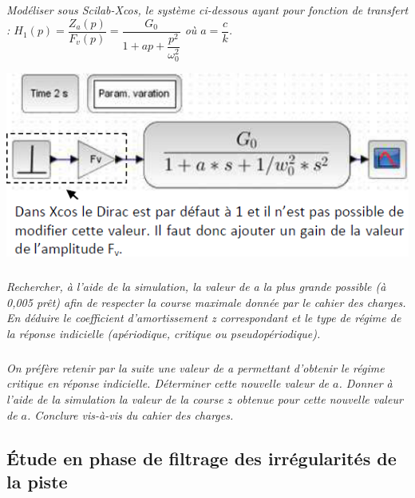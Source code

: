 \documentclass[10pt,fleqn]{article} %
\begin{document}
\begin{multicols}{2}
\subparagraph{}
\textit{Modéliser sous Scilab-Xcos, le système ci-dessous ayant pour fonction de transfert :
$H_1(p)=\dfrac{Z_a(p)}{F_v(p)}=\dfrac{G_0}{1+ap+\dfrac{p^2}{\omega_0^2}}$ où $a =\dfrac{c}{k}$.}


\begin{center}
\includegraphics[width=\linewidth]{images/img_04}
\end{center}




\subparagraph{}
\textit{Rechercher, à l’aide de la simulation, la valeur de a la plus grande possible (à 0,005 prêt) afin de respecter
la course maximale donnée par le cahier des charges. En déduire le coefficient d’amortissement z
correspondant et le type de régime de la réponse indicielle (apériodique, critique ou pseudopériodique).}
\ifprof
\begin{corrige}
\end{corrige}
\else
\fi



\subparagraph{}
\textit{On préfère retenir par la suite une valeur de a permettant d’obtenir le régime critique en réponse indicielle. Déterminer cette nouvelle valeur de $a$. Donner à l’aide de la simulation la valeur de la course $z$ obtenue pour cette nouvelle valeur de $a$. Conclure vis-à-vis du cahier des charges.}
\ifprof
\begin{corrige}
\end{corrige}
\else
\fi


\subsection*{Étude en phase de filtrage des irrégularités de la piste}


\end{multicols}
\end{document}
